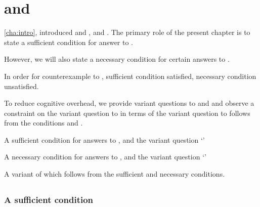 \chapter{\qWhyV{} and \qHowV{}}
\label{cha:var}


\begin{note}
  \autoref{cha:intro}, introduced \qWhy{} and \qHow{}, and \issueInclusion{}.
  The primary role of the present chapter is to state a sufficient condition for answer to \qWhy{}.

  However, we will also state a necessary condition for certain answers to \qHow{}.

  In order for counterexample to \issueInclusion{}, sufficient condition satisfied, necessary condition unsatisfied.

  To reduce cognitive overhead, we provide variant questions to \qWhy{} and \qHow{} and observe a constraint on the variant question to \qWhy{} in terms of the variant question to \qHow{} follows from the conditions and \issueInclusion{}.
\end{note}


\begin{note}
  \begin{TOCEnum}
  \item

    A sufficient condition for answers to \qWhy{}, and the variant question `\qWhyV{}'
  \item

    A necessary condition for answers to \qHow{}, and the variant question `\qHowV{}'
  \item

    A variant of \issueInclusion{} which follows from the sufficient and necessary conditions.
  \end{TOCEnum}
\end{note}



\section{\qWhyV{}}
\label{cha:var:qwhyvnp}



\subsection{A sufficient condition}
\label{sec:sufficient-condition}

